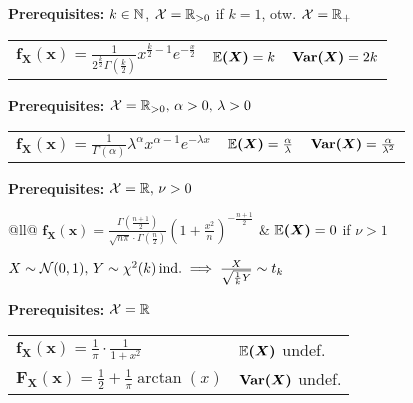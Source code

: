 \begin{cdefinition*}
  \textbf{Prerequisites:} \(k \in \mathbb{N}\), \(\operatorname{\mathcal{X}} = \mathbb{R}_{>0}\) if \(k = 1\), otw. \(\operatorname{\mathcal{X}} = \mathbb{R}_+\) \\
  \begin{tabularx}{\linewidth}{@{}lll@{}}
    \(\bm{f_X(x)} = \frac{1}{2^{\frac{k}{2}}\Gamma(\frac{k}{2})} x^{\frac{k}{2}-1}e^{-\frac{x}{2}}\) & \(\bm{\mathbb{E}(X)} = k\) & \(\bm{\Var(X)} = 2k\)
  \end{tabularx}
\end{cdefinition*}

\begin{cdefinition*}
  \textbf{Prerequisites:} \(\operatorname{\mathcal{X}} = \mathbb{R}_{>0}, \, \alpha > 0, \, \lambda > 0\) \\
  \begin{tabularx}{\linewidth}{@{}lll@{}}
    \(\bm{f_X(x)} = \frac{1}{\Gamma(\alpha)} \lambda^\alpha x^{\alpha - 1}e^{-\lambda x}\) & \(\bm{\mathbb{E}(X)} = \frac{\alpha}{\lambda}\) & \(\bm{\Var(X)} = \frac{\alpha}{\lambda^2}\)
  \end{tabularx}
\end{cdefinition*}

\begin{cdefinition*}
  \textbf{Prerequisites:} \(\operatorname{\mathcal{X}} = \mathbb{R}, \, \nu > 0\) \\
  \begin{tabularx}{\linewidth}{@{}ll@{}}
    \(\bm{f_X(x)} = \frac{\Gamma\left(\frac{n+1}{2}\right)}{\sqrt{n\pi} \cdot \Gamma(\frac{n}{2})} \left(1+\frac{x^2}{n}\right)^{-\frac{n+1}{2}}\) & \(\bm{\mathbb{E}(X)} = 0 \) if \(\nu > 1\) \\
  \end{tabularx}
\end{cdefinition*}

\begin{lemma}
  \(X \sim \operatorname{\mathcal{N}}(0, 1), \, Y \sim \chi^2(k) \, \text{ind.}\implies \frac{X}{\sqrt{\frac{1}{k}Y}} \sim t_k\)
\end{lemma}

\begin{cdefinition*}[{Cauchy}]
  \textbf{Prerequisites:} \(\operatorname{\mathcal{X}} = \mathbb{R}\) \\
  \begin{tabularx}{\linewidth}{@{}ll@{}}
    \(\bm{f_X(x)} = \frac{1}{\pi}\cdot \frac{1}{1 + x^2}\) & \(\bm{\mathbb{E}(X)}\) undef. \\
    \(\bm{F_X(x)} = \frac{1}{2} + \frac{1}{\pi} \arctan(x)\) & \(\bm{\Var(X)}\) undef.
  \end{tabularx}
\end{cdefinition*}


